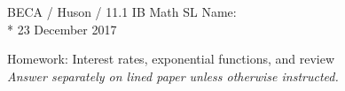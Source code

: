 \noindent BECA / Huson / 11.1 IB Math SL \hspace{2in} Name:\\*
23 December 2017
\begin{center}
{\Large Homework: Interest rates, exponential functions, and review}\\
\textit{Answer separately on lined paper unless otherwise instructed.}
\end{center}

